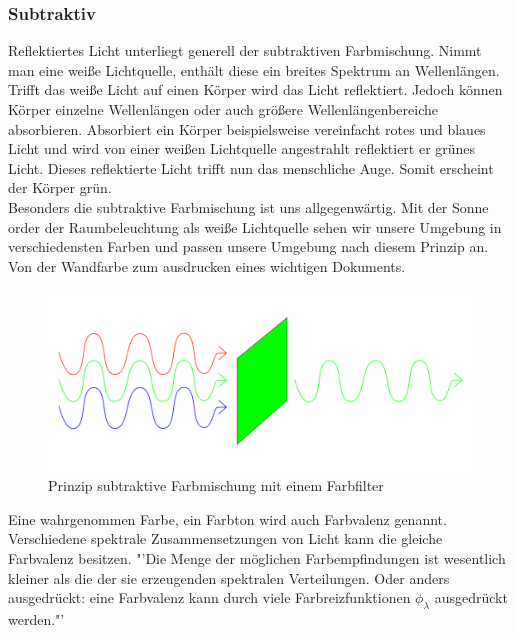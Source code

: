 \documentclass[11pt]{scrartcl}
\begin{document}
\subsubsection{Subtraktiv}
Reflektiertes Licht unterliegt generell der subtraktiven Farbmischung. Nimmt man eine weiße Lichtquelle, enthält diese ein breites Spektrum an Wellenlängen.
Trifft das weiße Licht auf einen Körper wird das Licht reflektiert. Jedoch können Körper einzelne Wellenlängen oder auch größere Wellenlängenbereiche
absorbieren. Absorbiert ein Körper beispielsweise vereinfacht rotes und blaues Licht und wird von einer weißen Lichtquelle angestrahlt reflektiert er grünes
Licht. Dieses reflektierte Licht trifft nun das menschliche Auge. Somit erscheint der Körper grün.
\cite[62]{lichtquellen}\\
Besonders die subtraktive Farbmischung ist uns allgegenwärtig. Mit der Sonne order der Raumbeleuchtung als weiße Lichtquelle sehen wir unsere Umgebung in
verschiedensten Farben und passen unsere Umgebung nach diesem Prinzip an. Von der Wandfarbe zum ausdrucken eines wichtigen Dokuments.\\
\begin{figure}[H]
    \begin{center}
        \includegraphics[width=.7\textwidth]{images/substractive_color_mixing.png}
    \end{center}
    \caption{Prinzip subtraktive Farbmischung mit einem Farbfilter}
\end{figure}
\noindent
Eine wahrgenommen Farbe, ein Farbton wird auch Farbvalenz genannt. Verschiedene spektrale Zusammensetzungen von Licht kann die gleiche Farbvalenz besitzen.
"'Die Menge der möglichen Farbempfindungen ist wesentlich kleiner als die der sie erzeugenden spektralen Verteilungen. Oder anders ausgedrückt: eine Farbvalenz
kann durch viele Farbreizfunktionen $\phi_\lambda$ ausgedrückt werden."'\cite[63]{lichtquellen}
\clearpage

\end{document}
